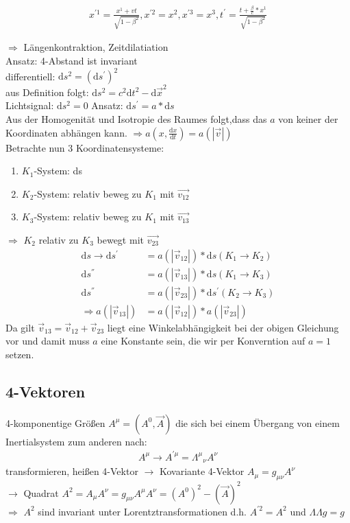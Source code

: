\documentclass[a4paper]{article}
\begin{document}
\begin{align}
x^{'1}=\frac{x^1+vt}{\sqrt{1-\beta^2}}, x^{'2}=x^2, x^{'3}=x^3,
t^{'}=\frac{t+\frac{\beta}{c}*x^1}{\sqrt{1-\beta^2}}
\end{align}

$\Rightarrow$ Längenkontraktion, Zeitdilatiation\\
Ansatz: 4-Abstand ist invariant\\
differentiell: $\mathrm{d}s^2=(\mathrm{d}s^{'})^2$\\
aus Definition folgt: $\mathrm{d}s^2=c^2\mathrm{d}t^2-\mathrm{d}\vec{x}^2$\\
Lichtsignal: $\mathrm{d}s^2=0$
Ansatz: $\mathrm{d}s^{'}=a*\mathrm{d}s$\\
Aus der Homogenität und Isotropie des Raumes folgt,dass das $a$ von keiner
der Koordinaten abhängen kann. $\Rightarrow a(x,\frac{\mathrm{d}x}{\mathrm{d}t})=a(|\vec{v}|)$\\
Betrachte nun 3 Koordinatensysteme:
\begin{enumerate}
  \item $K_1$-System: ds
  \item $K_2$-System: relativ beweg zu $K_1$ mit $\vec{v_{12}}$
  \item $K_3$-System: relativ beweg zu $K_1$ mit $\vec{v_{13}}$
\end{enumerate}
$\Rightarrow$ $K_2$ relativ zu $K_3$ bewegt mit $\vec{v_{23}}$
\begin{align}
\mathrm{d}s \rightarrow \mathrm{d}s^{'}&=a(|\vec{v}_{12}|)*\mathrm{d}s (K_1 \rightarrow K_2)\\
\mathrm{d}s^{''}&=a(|\vec{v}_{13}|)*\mathrm{d}s (K_1 \rightarrow K_3)\\
\mathrm{d}s^{''}&=a(|\vec{v}_{23}|)*\mathrm{d}s^{'} (K_2 \rightarrow K_3)\\
\Rightarrow  a(|\vec{v}_{13}|)&=a(|\vec{v}_{12}|)*a(|\vec{v}_{23}|)
\end{align}
Da gilt $\vec{v}_{13}=\vec{v}_{12}+\vec{v}_{23}$ liegt eine Winkelabhängigkeit
bei der obigen Gleichung vor und damit muss $a$ eine Konstante sein, die wir per
Konverntion auf $a=1$ setzen.

\subsection{4-Vektoren}
4-komponentige Größen $A^\mu=(A^0,\vec{A})$ die sich bei einem Übergang von
einem Inertialsystem zum anderen nach:
\begin{align}
A^{\mu}\rightarrow A^{'\mu}=\Lambda^\mu{}_\nu A^\nu
\end{align}
transformieren, heißen 4-Vektor
$\rightarrow$ Kovariante 4-Vektor $A_\mu=g_{\mu \nu} A^\nu$\\
$\rightarrow$ Quadrat $A^2 = A_\mu A^\nu= g_{\mu \nu} A^\mu  A^\nu =
(A^0)^2-(\vec{A})^2$\\
$\Rightarrow$ $A^2$ sind invariant unter Lorentztransformationen d.h.
$A^{'2}=A^2$ und $\Lambda \Lambda g=g$
\end{document}

